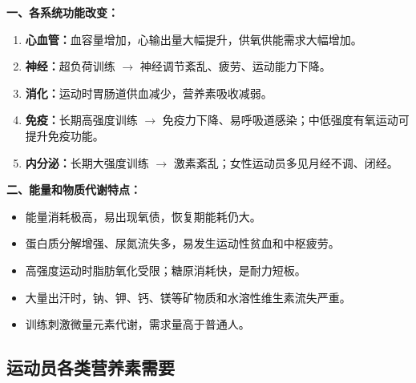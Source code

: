 \begin{defbox}
\textbf{一、各系统功能改变：}
\begin{enumerate}[leftmargin=*]
    \item \textbf{心血管：}血容量增加，心输出量大幅提升，供氧供能需求大幅增加。
    \item \textbf{神经：}超负荷训练 $\rightarrow$ 神经调节紊乱、疲劳、运动能力下降。
    \item \textbf{消化：}运动时胃肠道供血减少，营养素吸收减弱。
    \item \textbf{免疫：}长期高强度训练 $\rightarrow$ 免疫力下降、易呼吸道感染；中低强度有氧运动可提升免疫功能。
    \item \textbf{内分泌：}长期大强度训练 $\rightarrow$ 激素紊乱；女性运动员多见月经不调、闭经。
\end{enumerate}

\textbf{二、能量和物质代谢特点：}
\begin{itemize}[leftmargin=*]
    \item 能量消耗极高，易出现氧债，恢复期能耗仍大。
    \item 蛋白质分解增强、尿氮流失多，易发生运动性贫血和中枢疲劳。
    \item 高强度运动时脂肪氧化受限；糖原消耗快，是耐力短板。
    \item 大量出汗时，钠、钾、钙、镁等矿物质和水溶性维生素流失严重。
    \item 训练刺激微量元素代谢，需求量高于普通人。
\end{itemize}
\end{defbox}

\subsection{运动员各类营养素需要}

